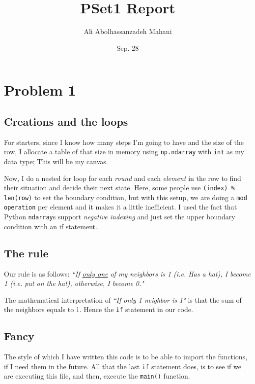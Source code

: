\documentclass[12pt]{article}
\title{PSet1 Report}
\author{Ali Abolhassanzadeh Mahani}
\date{Sep. 28}
\begin{document}
    \maketitle
    \section{Problem 1}
    \subsection{Creations and the loops}
    For starters, since I know how many steps I'm going to have and the size of the row,
    I allocate a table of that size in memory using \texttt{np.ndarray} with \texttt{int} as my data type; This will be my canvas.
    
    Now,  I do a nested for loop for each \textit{round} and each \textit{element} in the row
    to find their situation and decide their next state. Here, some people use 
    \texttt{(index) \% len(row)} to set the boundary condition, but with this setup, we are doing a \texttt{mod operation} per element and it makes it a little inefficient. I used the fact that Python \texttt{ndarray}s support \emph{negative indexing} and just set the upper boundary condition with an if statement.
    
    \subsection{The rule}
    Our rule is as follows: \emph{``If \underline{only one} of my neighbors is 1 (i.e. Has a hat), I become 1 (i.e. put on the hat), otherwise, I become 0."}
    
    The mathematical interpretation of \emph{``If only 1 neighbor is 1"} is that the sum of the neighbors equals to 1. Hence the \texttt{if} statement in our code.
    
    \subsection{Fancy}
    The style of which I have written this code is to be able to import the functions, if I
    need them in the future. All that the last \texttt{if} statement does, is to see if we are executing this file, and then, execute the \texttt{main()} function.
    
\end{document}
